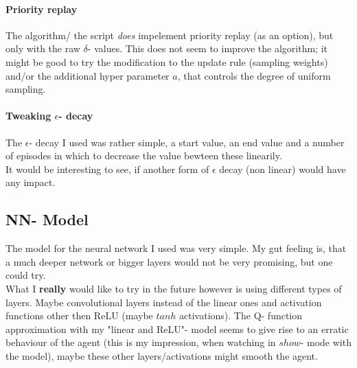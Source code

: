 \documentclass{article}
\begin{document}
\paragraph{Priority replay}
The algorithm/ the script \textit{does} impelement priority replay (as an option), but only
with the raw $\delta$- values. This does not seem to improve the algorithm; it might
be good to try the modification to the update rule (sampling weights) and/or the
additional hyper parameter $a$, that controls the degree of uniform sampling.

\paragraph{Tweaking $\epsilon$- decay}
The $\epsilon$- decay I used was rather simple, a start value, an end value and
a number of episodes in which to decrease the value bewteen these linearily.
\\
It would be interesting to see, if another form of $\epsilon$ decay (non linear)
would have any impact.

\subsection{NN- Model}
The model for the neural network I used was very simple. My gut feeling is,
that a much deeper network or bigger layers would not be very promising,
but one could try.
\\
What I \textbf{really} would like to try in the future however is using different
types of layers. Maybe convolutional layers instead of the linear ones and
activation functions other then ReLU (maybe $tanh$ activations).
The Q- function approximation with my "linear and ReLU"- model seems to give rise
to an erratic behaviour of the agent (this is my impression, when watching in
$show$- mode with the model), maybe these other layers/activations might smooth
the agent.
\end{document}
